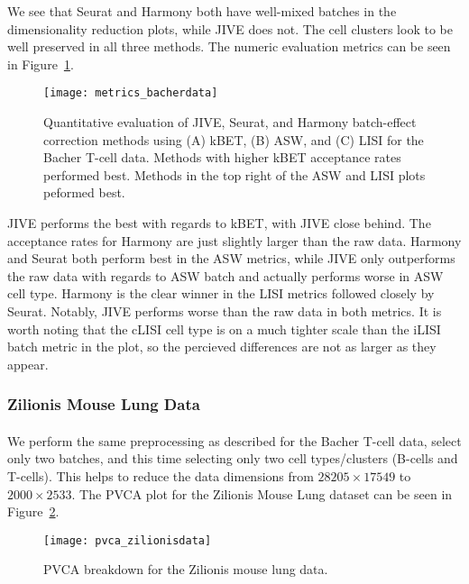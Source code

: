 \documentclass[
12pt, %
letterpaper, %
oneside, %
headinclude,footinclude, %
BCOR5mm, %
]{scrartcl}
\begin{document}
We see that Seurat and Harmony both have well-mixed batches in the dimensionality reduction plots, while JIVE does not. The cell clusters look to be well preserved in all three methods. The numeric evaluation metrics can be seen in Figure~\ref{fig:metrics_bacherdata}.

\begin{figure}[H]
    \centering 
    \texttt{[image: metrics\_bacherdata]} 
    \caption[Metrics for the Bacher T-Cell Data]{Quantitative evaluation of JIVE, Seurat, and Harmony batch-effect correction methods using (A) kBET, (B) ASW, and (C) LISI for the Bacher T-cell data. Methods with higher kBET acceptance rates performed best. Methods in the top right of the ASW and LISI plots peformed best.}
    \label{fig:metrics_bacherdata} 
\end{figure}

JIVE performs the best with regards to kBET, with JIVE close behind. The acceptance rates for Harmony are just slightly larger than the raw data. Harmony and Seurat both perform best in the ASW metrics, while JIVE only outperforms the raw data with regards to ASW batch and actually performs worse in ASW cell type. Harmony is the clear winner in the LISI metrics followed closely by Seurat. Notably, JIVE performs worse than the raw data in both metrics. It is worth noting that the cLISI cell type is on a much tighter scale than the iLISI batch metric in the plot, so the percieved differences are not as larger as they appear.


\subsubsection*{Zilionis Mouse Lung Data}

\paragraph*{}
We perform the same preprocessing as described for the Bacher T-cell data, select only two batches, and this time selecting only two cell types/clusters (B-cells and T-cells). This helps to reduce the data dimensions from $28205 \times 17549$ to $2000 \times 2533$. The PVCA plot for the Zilionis Mouse Lung dataset can be seen in Figure~\ref{fig:pvca_zilionisdata}.

\begin{figure}[H]
    \centering 
    \texttt{[image: pvca\_zilionisdata]} 
    \caption[PVCA Breakdown for the Zilionis Mouse Lung Data]{PVCA breakdown for the Zilionis mouse lung data.}
    \label{fig:pvca_zilionisdata} 
\end{figure}
\end{document}
